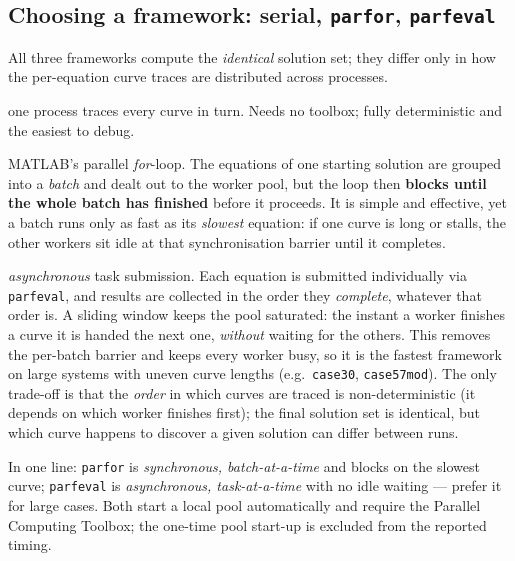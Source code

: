 \documentclass[11pt,a4paper]{article}
\newcommand{\code}[1]{\texttt{#1}}
\begin{document}
\subsection{Choosing a framework: serial, \code{parfor}, \code{parfeval}}\label{sec:frameworks}
All three frameworks compute the \emph{identical} solution set; they differ only in how the
per-equation curve traces are distributed across processes.
\begin{description}[leftmargin=0em,style=nextline]
\item[Serial (\code{run_batch.m})] one process traces every curve in turn. Needs no
      toolbox; fully deterministic and the easiest to debug.
\item[\code{parfor} (\code{run_batch_par.m})] MATLAB's parallel \emph{for}-loop. The
      equations of one starting solution are grouped into a \emph{batch} and dealt out to
      the worker pool, but the loop then \textbf{blocks until the whole batch has
      finished} before it proceeds. It is simple and effective, yet a batch runs only as
      fast as its \emph{slowest} equation: if one curve is long or stalls, the other
      workers sit idle at that synchronisation barrier until it completes.
\item[\code{parfeval} (\code{run_batch_parfeval.m})] \emph{asynchronous} task submission.
      Each equation is submitted individually via \code{parfeval}, and results are
      collected in the order they \emph{complete}, whatever that order is. A sliding window
      keeps the pool saturated: the instant a worker finishes a curve it is handed the next
      one, \emph{without} waiting for the others. This removes the per-batch barrier and
      keeps every worker busy, so it is the fastest framework on large systems with uneven
      curve lengths (e.g.\ \code{case30}, \code{case57mod}). The only trade-off is that the
      \emph{order} in which curves are traced is non-deterministic (it depends on which
      worker finishes first); the final solution set is identical, but which curve happens
      to discover a given solution can differ between runs.
\end{description}
In one line: \code{parfor} is \emph{synchronous, batch-at-a-time} and blocks on the slowest
curve; \code{parfeval} is \emph{asynchronous, task-at-a-time} with no idle waiting ---
prefer it for large cases. Both start a local pool automatically and require the Parallel
Computing Toolbox; the one-time pool start-up is excluded from the reported timing.
\end{document}
